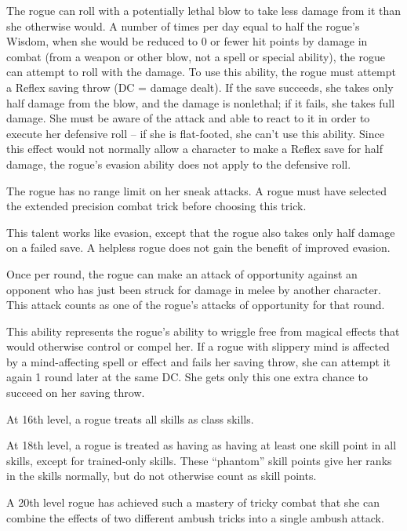   The rogue can roll with a potentially lethal blow to take less damage from it than she otherwise would.  A number of times per day equal to half the rogue's Wisdom, when she would be reduced to 0 or fewer hit points by damage in combat (from a weapon or other blow, not a spell or special ability), the rogue can attempt to roll with the damage. To use this ability, the rogue must attempt a Reflex saving throw (DC = damage dealt). If the save succeeds, she takes only half damage from the blow, and the damage is nonlethal; if it fails, she takes full damage. She must be aware of the attack and able to react to it in order to execute her defensive roll -- if she is flat-footed, she can't use this ability. Since this effect would not normally allow a character to make a Reflex save for half damage, the rogue's evasion ability does not apply to the defensive roll.

 The rogue has no range limit on her sneak attacks. A rogue must have selected the extended precision combat trick before choosing this trick.

 This talent works like evasion, except that the rogue also takes only half damage on a failed save. A helpless rogue does not gain the benefit of improved evasion.

  Once per round, the rogue can make an attack of opportunity against an opponent who has just been struck for damage in melee by another character. This attack counts as one of the rogue's attacks of opportunity for that round.

  This ability represents the rogue's ability to wriggle free from magical effects that would otherwise control or compel her. If a rogue with slippery mind is affected by a mind-affecting spell or effect and fails her saving throw, she can attempt it again 1 round later at the same DC. She gets only this one extra chance to succeed on her saving throw.


 At 16th level, a rogue treats all skills as class skills.

 At 18th level, a rogue is treated as having as having at least one skill point in all skills, except for trained-only skills. These ``phantom'' skill points give her ranks in the skills normally, but do not otherwise count as skill points.

 A 20th level rogue has achieved such a mastery of tricky combat that she can combine the effects of two different ambush tricks into a single ambush attack.

